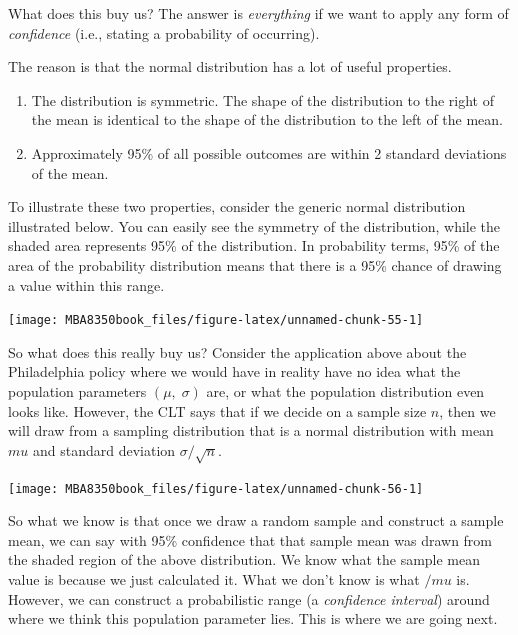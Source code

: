 \documentclass[
]{book}
\begin{document}
What does this buy us? The answer is \emph{everything} if we want to apply any form of \emph{confidence} (i.e., stating a probability of occurring).

The reason is that the normal distribution has a lot of useful properties.

\begin{enumerate}
\def\labelenumi{\arabic{enumi}.}
\item
  The distribution is symmetric. The shape of the distribution to the right of the mean is identical to the shape of the distribution to the left of the mean.
\item
  Approximately 95\% of all possible outcomes are within 2 standard deviations of the mean.
\end{enumerate}

To illustrate these two properties, consider the generic normal distribution illustrated below. You can easily see the symmetry of the distribution, while the shaded area represents 95\% of the distribution. In probability terms, 95\% of the area of the probability distribution means that there is a 95\% chance of drawing a value within this range.

\begin{center}\texttt{[image: MBA8350book\_files/figure-latex/unnamed-chunk-55-1]} \end{center}

So what does this really buy us? Consider the application above about the Philadelphia policy where we would have in reality have no idea what the population parameters \((\mu,\;\sigma)\) are, or what the population distribution even looks like. However, the CLT says that if we decide on a sample size \(n\), then we will draw from a sampling distribution that is a normal distribution with mean \(mu\) and standard deviation \(\sigma / \sqrt{n}\).

\begin{center}\texttt{[image: MBA8350book\_files/figure-latex/unnamed-chunk-56-1]} \end{center}

So what we know is that once we draw a random sample and construct a sample mean, we can say with 95\% confidence that that sample mean was drawn from the shaded region of the above distribution. We know what the sample mean value is because we just calculated it. What we don't know is what \(/mu\) is. However, we can construct a probabilistic range (a \emph{confidence interval}) around where we think this population parameter lies. This is where we are going next.
\end{document}

